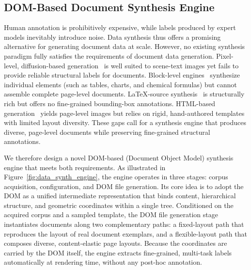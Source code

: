 \subsection{DOM-Based Document Synthesis Engine}
\label{sec:synthesis}

Human annotation is prohibitively expensive, while labels produced by expert models inevitably introduce noise. Data synthesis thus offers a promising alternative for generating document data at scale. However, no existing synthesis paradigm fully satisfies the requirements of document data generation. Pixel-level, diffusion-based generation~\cite{textdiffuser,anyword3m} is well suited to scene-text images yet fails to provide reliable structural labels for documents. Block-level engines~\cite{tableformer,cosyn,decimer} synthesize individual elements (such as tables, charts, and chemical formulas) but cannot assemble complete page-level documents. LaTeX-source synthesis~\cite{nougat,vary} is structurally rich but offers no fine-grained bounding-box annotations. HTML-based generation~\cite{wang2025infinity,poznanski2025olmocr2} yields page-level images but relies on rigid, hand-authored templates with limited layout diversity. These gaps call for a synthesis engine that produces diverse, page-level documents while preserving fine-grained structural annotations.

We therefore design a novel DOM-based (Document Object Model) synthesis engine that meets both requirements. As illustrated in Figure~\ref{fig:data_synth_engine}, the engine operates in three stages: corpus acquisition, configuration, and DOM file generation. Its core idea is to adopt the DOM as a unified intermediate representation that binds content, hierarchical structure, and geometric coordinates within a single tree. Conditioned on the acquired corpus and a sampled template, the DOM file generation stage instantiates documents along two complementary paths: a fixed-layout path that reproduces the layout of real document exemplars, and a flexible-layout path that composes diverse, content-elastic page layouts. Because the coordinates are carried by the DOM itself, the engine extracts fine-grained, multi-task labels automatically at rendering time, without any post-hoc annotation.


